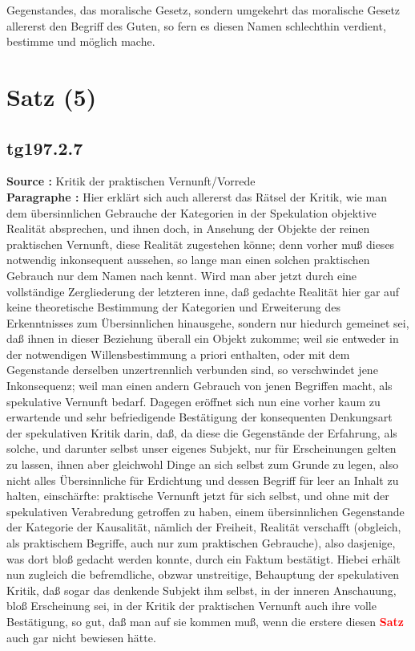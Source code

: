 \documentclass[a4paper,12pt,twoside]{book}
\newcommand{\match}[1]{\textcolor{red}{\textbf{#1}}}
\newcommand{\unnumberedsection}[1]{
	\section*{#1}
	\addcontentsline{toc}{section}{#1}
	\markright{#1}
}
\begin{document}
Gegenstandes, das moralische Gesetz, sondern umgekehrt das moralische Gesetz allererst den Begriff des Guten, so fern es diesen Namen schlechthin verdient, bestimme und möglich mache. 
	
	\unnumberedsection{Satz (5)} 
	\subsection*{tg197.2.7} 
	\textbf{Source : }Kritik der praktischen Vernunft/Vorrede\\  
	
	\noindent\textbf{Paragraphe : }Hier erklärt sich auch allererst das Rätsel der Kritik, wie man dem übersinnlichen Gebrauche der Kategorien in der Spekulation objektive Realität absprechen, und ihnen doch, in Ansehung der Objekte der reinen praktischen Vernunft, diese Realität zugestehen könne; denn vorher muß dieses notwendig inkonsequent aussehen, so lange man einen solchen praktischen Gebrauch nur dem Namen nach kennt. Wird man aber jetzt durch eine vollständige  Zergliederung der letzteren inne, daß gedachte Realität hier gar auf keine theoretische Bestimmung der Kategorien und Erweiterung des Erkenntnisses zum Übersinnlichen hinausgehe, sondern nur hiedurch gemeinet sei, daß ihnen in dieser Beziehung überall ein Objekt zukomme; weil sie entweder in der notwendigen Willensbestimmung a priori enthalten, oder mit dem Gegenstande derselben unzertrennlich verbunden sind, so verschwindet jene Inkonsequenz; weil man einen andern Gebrauch von jenen Begriffen macht, als spekulative Vernunft bedarf. Dagegen eröffnet sich nun eine vorher kaum zu erwartende und sehr befriedigende Bestätigung der konsequenten Denkungsart der spekulativen Kritik darin, daß, da diese die Gegenstände der Erfahrung, als solche, und darunter selbst unser eigenes Subjekt, nur für Erscheinungen gelten zu lassen, ihnen aber gleichwohl Dinge an sich selbst zum Grunde zu legen, also nicht alles Übersinnliche für Erdichtung und dessen Begriff für leer an Inhalt zu halten, einschärfte: praktische Vernunft jetzt für sich selbst, und ohne mit der spekulativen Verabredung getroffen zu haben, einem übersinnlichen Gegenstande der Kategorie der Kausalität, nämlich der Freiheit, Realität verschafft (obgleich, als praktischem Begriffe, auch nur zum praktischen Gebrauche), also dasjenige, was dort bloß gedacht werden konnte, durch ein Faktum bestätigt. Hiebei erhält nun zugleich die befremdliche, obzwar unstreitige, Behauptung der spekulativen Kritik, daß sogar das denkende Subjekt ihm selbst, in der inneren Anschauung, bloß Erscheinung sei, in der Kritik der praktischen Vernunft auch ihre volle Bestätigung, so gut, daß man auf sie kommen muß, wenn die erstere diesen \match{Satz} auch gar nicht bewiesen hätte.
	
\end{document}
